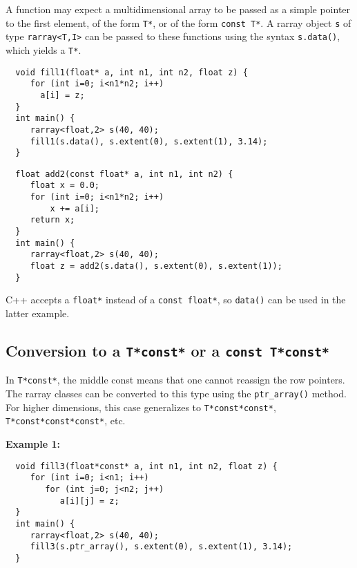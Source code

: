 \documentclass[11pt,twoside]{article}
\begin{document}
A function may expect a multidimensional array to be passed as a
simple pointer to the first element, of the form \texttt{T*}, or of the form  \texttt{const T*}. A rarray object
\texttt{s} of type \texttt{rarray{\tt<}T,I{\tt>}} can be passed to these
functions using the syntax \texttt{s.data()}, which yields a
\texttt{T*}.

\begin{framed}\vspace{-15pt}%
\begin{verbatim}
  void fill1(float* a, int n1, int n2, float z) {
     for (int i=0; i<n1*n2; i++)
       a[i] = z;
  }
  int main() {
     rarray<float,2> s(40, 40);
     fill1(s.data(), s.extent(0), s.extent(1), 3.14);
  }
\end{verbatim}%
\end{framed}

\pagebreak[3]

\vspace{-5pt}\begin{framed}\vspace{-14pt}%
\begin{verbatim}
  float add2(const float* a, int n1, int n2) {
     float x = 0.0;
     for (int i=0; i<n1*n2; i++)
         x += a[i];
     return x;
  }
  int main() {
     rarray<float,2> s(40, 40);
     float z = add2(s.data(), s.extent(0), s.extent(1));
  }
\end{verbatim}%
\vspace{-14pt}\end{framed}\vspace{-8pt}

\noindent
C++ accepts a \texttt{float*} instead of a \texttt{const float*}, so \texttt{data()} can be used in the latter example.

\subsection{Conversion to a {\tt T*const*} or a {\tt const T*const*} }

\noindent
In \texttt{T*const*}, the middle const means that one cannot reassign the row pointers.
The rarray classes can be converted to this type using the \texttt{ptr\_array()} method. 
For higher dimensions, this case generalizes to \texttt{T*const*const*}, \texttt{T*const*const*const*}, etc.

\noindent
{\bf Example 1:}
\vspace{-5pt}\begin{framed}\vspace{-14pt}%
\begin{verbatim}
  void fill3(float*const* a, int n1, int n2, float z) {
     for (int i=0; i<n1; i++)
        for (int j=0; j<n2; j++)
           a[i][j] = z;
  }
  int main() {
     rarray<float,2> s(40, 40);
     fill3(s.ptr_array(), s.extent(0), s.extent(1), 3.14);
  }
\end{verbatim}%
\vspace{-14pt}\end{framed}\vspace{-8pt}
\end{document}
